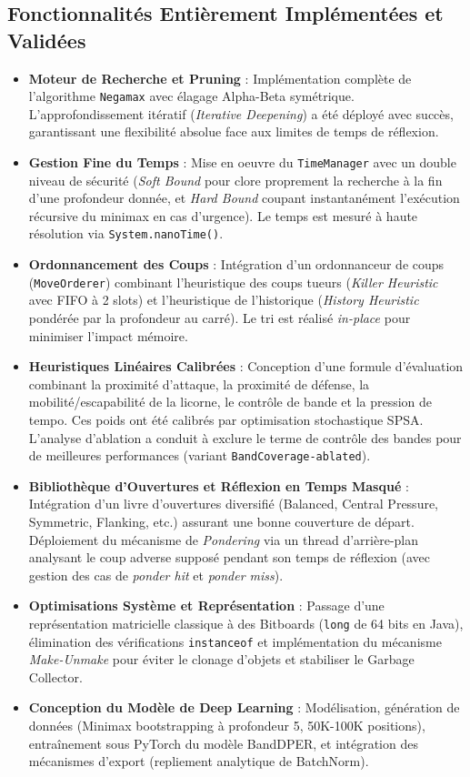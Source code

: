 \documentclass[12pt,a4paper]{article}
\begin{document}
\subsection{Fonctionnalités Entièrement Implémentées et Validées}
\begin{itemize}
    \item \textbf{Moteur de Recherche et Pruning} : Implémentation complète de l'algorithme \texttt{Negamax} avec élagage Alpha-Beta symétrique. L'approfondissement itératif (\textit{Iterative Deepening}) a été déployé avec succès, garantissant une flexibilité absolue face aux limites de temps de réflexion.
    \item \textbf{Gestion Fine du Temps} : Mise en oeuvre du \texttt{TimeManager} avec un double niveau de sécurité (\textit{Soft Bound} pour clore proprement la recherche à la fin d'une profondeur donnée, et \textit{Hard Bound} coupant instantanément l'exécution récursive du minimax en cas d'urgence). Le temps est mesuré à haute résolution via \texttt{System.nanoTime()}.
    \item \textbf{Ordonnancement des Coups} : Intégration d'un ordonnanceur de coups (\texttt{MoveOrderer}) combinant l'heuristique des coups tueurs (\textit{Killer Heuristic} avec FIFO à 2 slots) et l'heuristique de l'historique (\textit{History Heuristic} pondérée par la profondeur au carré). Le tri est réalisé \textit{in-place} pour minimiser l'impact mémoire.
    \item \textbf{Heuristiques Linéaires Calibrées} : Conception d'une formule d'évaluation combinant la proximité d'attaque, la proximité de défense, la mobilité/escapabilité de la licorne, le contrôle de bande et la pression de tempo. Ces poids ont été calibrés par optimisation stochastique SPSA. L'analyse d'ablation a conduit à exclure le terme de contrôle des bandes pour de meilleures performances (variant \texttt{BandCoverage-ablated}).
    \item \textbf{Bibliothèque d'Ouvertures et Réflexion en Temps Masqué} : Intégration d'un livre d'ouvertures diversifié (Balanced, Central Pressure, Symmetric, Flanking, etc.) assurant une bonne couverture de départ. Déploiement du mécanisme de \textit{Pondering} via un thread d'arrière-plan analysant le coup adverse supposé pendant son temps de réflexion (avec gestion des cas de \textit{ponder hit} et \textit{ponder miss}).
    \item \textbf{Optimisations Système et Représentation} : Passage d'une représentation matricielle classique à des Bitboards (\texttt{long} de 64 bits en Java), élimination des vérifications \texttt{instanceof} et implémentation du mécanisme \textit{Make-Unmake} pour éviter le clonage d'objets et stabiliser le Garbage Collector.
    \item \textbf{Conception du Modèle de Deep Learning} : Modélisation, génération de données (Minimax bootstrapping à profondeur 5, 50K-100K positions), entraînement sous PyTorch du modèle BandDPER, et intégration des mécanismes d'export (repliement analytique de BatchNorm).
\end{itemize}
\end{document}
